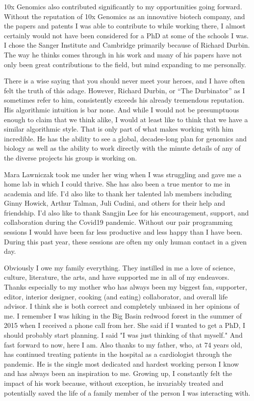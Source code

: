 \begin{acknowledgements}
10x Genomics also contributed significantly to my opportunities going forward. Without the reputation of 10x Genomics as an innovative biotech company, and the papers and patents I was able to contribute to while working there, I almost certainly would not have been considered for a PhD at some of the schools I was. I chose the Sanger Institute and Cambridge primarily because of Richard Durbin. The way he thinks comes through in his work and many of his papers have not only been great contributions to the field, but mind expanding to me personally. 

There is a wise saying that you should never meet your heroes, and I have often felt the truth of this adage. However, Richard Durbin, or ``The Durbinator'' as I sometimes refer to him, consistently exceeds his already tremendous reputation. His algorithmic intuition is bar none. And while I would not be presumptuous enough to claim that we think alike, I would at least like to think that we have a similar algorithmic style. That is only part of what makes working with him incredible. He has the ability to see a global, decades-long plan for genomics and biology as well as the ability to work directly with the minute details of any of the diverse projects his group is working on.

Mara Lawniczak took me under her wing when I was struggling and gave me a home lab in which I could thrive. She has also been a true mentor to me in academia and life. I'd also like to thank her talented lab members including Ginny Howick, Arthur Talman, Juli Cudini, and others for their help and friendship. I'd also like to thank Sangjin Lee for his encouragement, support, and collaboration during the Covid19 pandemic. Without our pair programming sessions I would have been far less productive and less happy than I have been. During this past year, these sessions are often my only human contact in a given day. 

Obviously I owe my family everything. They instilled in me a love of science, culture, literature, the arts, and have supported me in all of my endeavors. Thanks especially to my mother who has always been my biggest fan, supporter, editor, interior designer, cooking (and eating) collaborator, and overall life advisor. I think she is both correct and completely unbiased in her opinions of me. I remember I was hiking in the Big Basin redwood forest in the summer of 2015 when I received a phone call from her. She said if I wanted to get a PhD, I should probably start planning. I said "I was just thinking of that myself." And fast forward to now, here I am. Also thanks to my father, who, at 74 years old, has continued treating patients in the hospital as a cardiologist through the pandemic. He is the single most dedicated and hardest working person I know and has always been an inspiration to me. Growing up, I constantly felt the impact of his work because, without exception, he invariably treated and potentially saved the life of a family member of the person I was interacting with. 


\end{acknowledgements}
